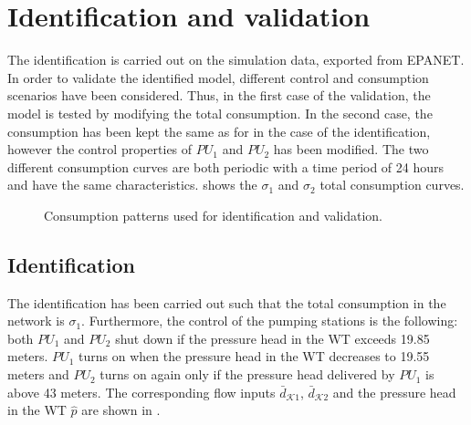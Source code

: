 \section{Identification and validation}
\label{identification_and_validation_of_the_output_eq} 

The identification is carried out on the simulation data, exported from EPANET. In order to validate the identified model, different control and consumption scenarios have been considered. Thus, in the first case of the validation, the model is tested by modifying the total consumption. In the second case, the consumption has been kept the same as for in the case of the identification, however the control properties of $PU_1$ and $PU_2$ has been modified. The two different consumption curves are both periodic with a time period of 24 hours and have the same characteristics.  shows the $\sigma_1$ and $\sigma_2$ total consumption curves. 

 \begin{figure}[H]
 \centering
  
 \vspace{-2.5mm}
 \caption{Consumption patterns used for identification and validation.}
 \label{fig:sigma123}
 \end{figure}

 \vspace{-3mm}

 \subsection{Identification}
 \label{identification}

 The identification has been carried out such that the total consumption in the network is $\sigma_1$. Furthermore, the control of the pumping stations is the following: both $PU_1$ and $PU_2$ shut down if the pressure head in the WT exceeds 19.85 meters. $PU_1$ turns on when the pressure head in the WT decreases to 19.55 meters and $PU_2$ turns on again only if the pressure head delivered by $PU_1$ is above 43 meters. The corresponding flow inputs $\bar{d}_{\mathcal{K}1}$, $\bar{d}_{\mathcal{K}2}$ and the pressure head in the WT $\hat{p}$ are shown in .

 \vspace{-3mm}

